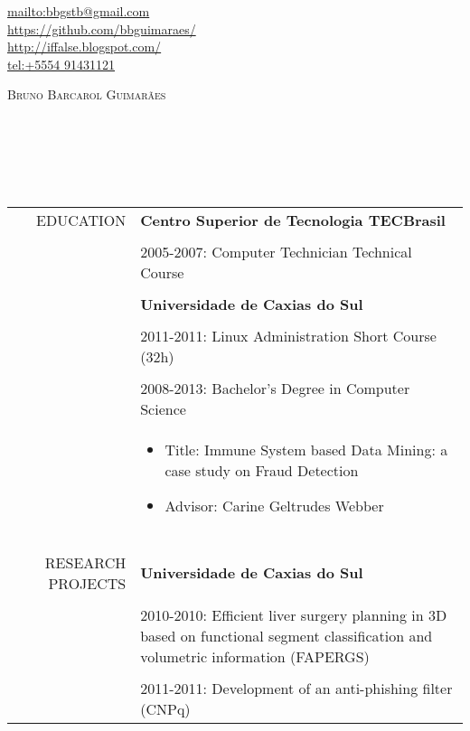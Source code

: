 \begin{flushright}
    \url{mailto:bbgstb@gmail.com} \\
    \url{https://github.com/bbguimaraes/} \\
    \url{http://iffalse.blogspot.com/} \\
    \url{tel:+5554 91431121} \\
\end{flushright}
\vspace{5mm}
\textsc{\Huge Bruno Barcarol Guimarães} \\\\\\\\\\\\
\begin{tabular}{rp{13cm}}
    \uppercase{Education}
    & \textbf{Centro Superior de Tecnologia TECBrasil} \\\\
    & 2005-2007: Computer Technician Technical Course \\\\
    & \textbf{Universidade de Caxias do Sul} \\\\
    & 2011-2011: Linux Administration Short Course (32h) \\\\
    & 2008-2013: Bachelor's Degree in Computer Science \\
    & \begin{itemize}
        \vspace{-5mm}
        \itemsep-1mm
        \item Title:
            Immune System based Data Mining: a case study on Fraud
            Detection
        \item Advisor: Carine Geltrudes Webber
    \end{itemize}
    \\\\
    \hline
    \\\\
    \uppercase{Research projects}
    & \textbf{Universidade de Caxias do Sul} \\\\
    & 2010-2010:
        Efficient liver surgery planning in 3D based on functional segment
        classification and volumetric information (FAPERGS) \\\\
    & 2011-2011: Development of an anti-phishing filter (CNPq)

\end{tabular}
